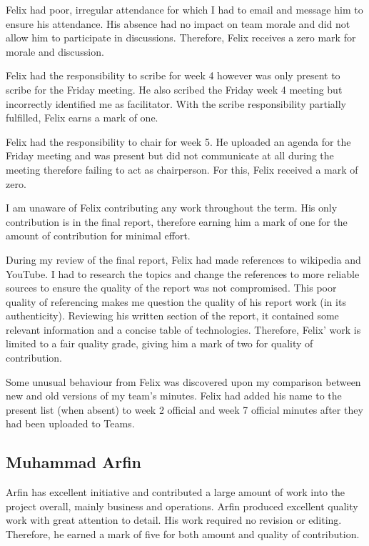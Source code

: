\documentclass[11pt, a4, nocenter, margin=150mm]{article}
\begin{document}
	Felix had poor, irregular attendance for which I had to email and message him to ensure his attendance. His absence had no impact on team morale and did not allow him to participate in discussions. Therefore, Felix receives a zero mark for morale and discussion.

	Felix had the responsibility to scribe for week 4 however was only present to scribe for the Friday meeting. He also scribed the Friday week 4 meeting but incorrectly identified me as facilitator. With the scribe responsibility partially fulfilled, Felix earns a mark of one.

	Felix had the responsibility to chair for week 5. He uploaded an agenda for the Friday meeting and was present but did not communicate at all during the meeting therefore failing to act as chairperson. For this, Felix received a mark of zero.

	I am unaware of Felix contributing any work throughout the term. His only contribution is in the final report, therefore earning him a mark of one for the amount of contribution for minimal effort.

	During my review of the final report, Felix had made references to wikipedia and YouTube. I had to research the topics and change the references to more reliable sources to ensure the quality of the report was not compromised. This poor quality of referencing makes me question the quality of his report work (in its authenticity). Reviewing his written section of the report, it contained some relevant information and a concise table of technologies. Therefore, Felix' work is limited to a fair quality grade, giving him a mark of two for quality of contribution.

	Some unusual behaviour from Felix was discovered upon my comparison between new and old versions of my team's minutes. Felix had added his name to the present list (when absent) to week 2 official and week 7 official minutes after they had been uploaded to Teams.

	\subsection{Muhammad Arfin}

	Arfin has excellent initiative and contributed a large amount of work into the project overall, mainly business and operations. Arfin produced excellent quality work with great attention to detail. His work required no revision or editing. Therefore, he earned a mark of five for both amount and quality of contribution.
\end{document}
